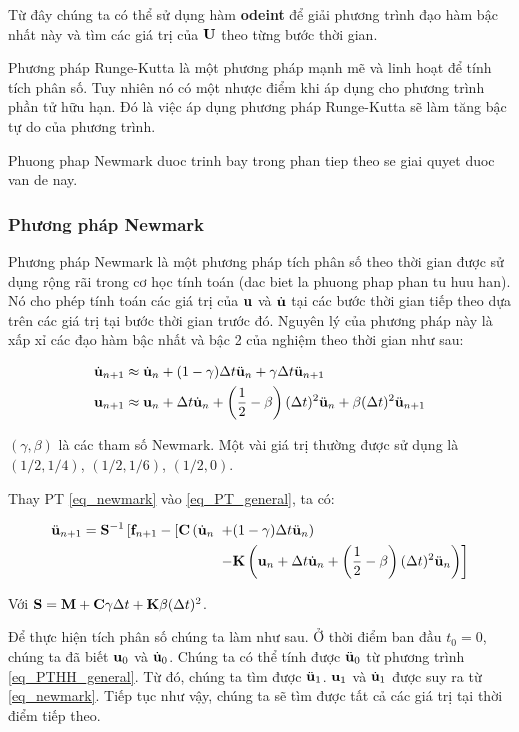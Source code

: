 Từ đây chúng ta có thể sử dụng hàm \textbf{odeint} để giải phương trình đạo hàm bậc nhất này và tìm các giá trị của ${\bf U}$ theo từng bước thời gian.

Phương pháp Runge-Kutta là một phương pháp mạnh mẽ và linh hoạt để  tính tích phân số. Tuy nhiên nó có một nhược điểm khi áp dụng cho phương trình phần tử hữu hạn. Đó là việc áp dụng phương pháp Runge-Kutta sẽ làm tăng bậc tự do của phương trình.

Phuong phap Newmark duoc trinh bay trong phan tiep theo se giai quyet duoc van de nay.

\subsubsection{Phương pháp Newmark}

Phương pháp Newmark là một phương pháp tích phân số theo thời gian được sử dụng rộng rãi trong cơ học tính toán (dac biet la phuong phap phan tu huu han). Nó cho phép tính toán các giá trị của ${\bf u}$ và $\dot{\bf u}$ tại các bước thời gian tiếp theo dựa trên các giá trị tại bước thời gian trước đó. Nguyên lý của phương pháp này là xấp xỉ các đạo hàm bậc nhất và bậc 2 của nghiệm theo thời gian như sau:

\begin{equation}\label{eq_newmark}
    \begin{aligned}
    \dot{\bf u}_{n+1} &\approx \dot{\bf u}_n+(1-\gamma) \Delta t \ddot{\bf u}_n+\gamma \Delta t \ddot{\bf u}_{n+1}\\
    {\bf u}_{n+1} &\approx {\bf u}_n+\Delta t \dot{\bf u}_n+\left(\frac{1}{2}-\beta\right)(\Delta t)^2 \ddot{\bf u}_n+\beta(\Delta t)^2 \ddot{\bf u}_{n+1}
\end{aligned}
\end{equation}

$(\gamma, \beta)$ là các tham số Newmark. Một vài giá trị thường được sử dụng là $(1/2, 1/4)$, $(1/2, 1/6)$, $(1/2, 0)$.

Thay PT \cref{eq_newmark} vào \cref{eq_PT_general}, ta có:

\begin{equation}
    \begin{aligned}
    \ddot{\bf u}_{n+1}={\bf S}^{-1}\left[{\bf f}_{n+1}-[{\bf C}\left(\dot{\bf u}_n\right.\right. & \left.+(1-\gamma) \Delta t \ddot{\bf u}_n\right) \\
& \left.-{\bf K}\left({\bf u}_n+\Delta t \dot{\bf u}_n+\left(\frac{1}{2}-\beta\right)(\Delta t)^2 \ddot{\bf u}_n\right)\right]
\end{aligned}
\end{equation}

Với ${\bf S} = {\bf M} + {\bf C}\gamma\Delta t + {\bf K}\beta(\Delta t)^2$.

Để thực hiện tích phân số chúng ta làm như sau. Ở thời điểm ban đầu $t_0=0$, chúng ta đã biết ${\bf u}_0$ và $\dot{\bf u}_0$. Chúng ta có thể tính được $\ddot{\bf u}_0$ từ phương trình \cref{eq_PTHH_general}. Từ đó, chúng ta tìm được $\ddot{\bf u}_1$. ${\bf u}_1$ và $\dot{\bf u}_1$ được suy ra từ \cref{eq_newmark}. Tiếp tục như vậy, chúng ta sẽ tìm được tất cả các giá trị tại thời điểm tiếp theo.

